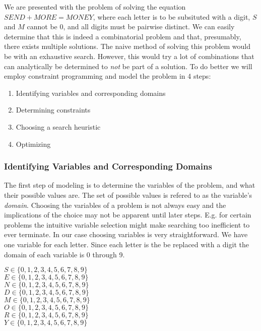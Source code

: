 We are presented with the problem of solving the equation $SEND + MORE = MONEY$, where
each letter is to be subsituted with a digit, $S$ and $M$ cannot be 0, and all digits must
be pairwise distinct. We can easily determine that this is indeed a combinatorial problem
and that, presumably, there exists multiple solutions. The naive method of solving this
problem would be with an exhaustive search. However, this would try a lot of combinations
that can analytically be determined to \textit{not} be part of a solution. To do better we
will employ constraint programming and model the problem in 4 steps:

\begin{enumerate}
	\item Identifying variables and corresponding domains
	\item Determining constraints
	\item Choosing a search heuristic
	\item Optimizing
\end{enumerate}

\subsubsection{Identifying Variables and Corresponding Domains}

The first step of modeling is to determine the variables of the problem, and what their
possible values are. The set of possible values is refered to as the variable's \textit{
domain}. Choosing the variables of a problem is not always easy and the implications
of the choice may not be apparent until later steps. E.g. for certain problems the intuitive
variable selection might make searching too inefficient to ever terminate. In our case
choosing variables is very straightforward. We have one variable for each letter. Since
each letter is the be replaced with a digit the domain of each variable is 0 through 9.

\vspace{0.5cm}
\noindent
$S \in \{0, 1, 2, 3, 4, 5, 6, 7, 8, 9\}$ \\
$E \in \{0, 1, 2, 3, 4, 5, 6, 7, 8, 9\}$ \\
$N \in \{0, 1, 2, 3, 4, 5, 6, 7, 8, 9\}$ \\
$D \in \{0, 1, 2, 3, 4, 5, 6, 7, 8, 9\}$ \\
$M \in \{0, 1, 2, 3, 4, 5, 6, 7, 8, 9\}$ \\
$O \in \{0, 1, 2, 3, 4, 5, 6, 7, 8, 9\}$ \\
$R \in \{0, 1, 2, 3, 4, 5, 6, 7, 8, 9\}$ \\
$Y \in \{0, 1, 2, 3, 4, 5, 6, 7, 8, 9\}$

